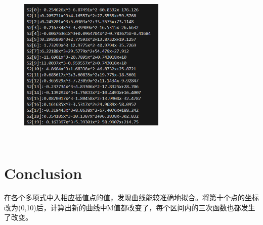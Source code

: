 \documentclass{ctexart}
\begin{document}
				\begin{figure}[H]
					\centering 
					\includegraphics[height=8cm,width=7cm]{4.png}
					\end{figure}
		\section{Conclusion}
		在各个多项式中入相应插值点的值，发现曲线能较准确地拟合。将第十个点的坐标改为(0,10)后，计算出新的曲线中M值都改变了，每个区间内的三次函数也都发生了改变。
    
\end{document}
